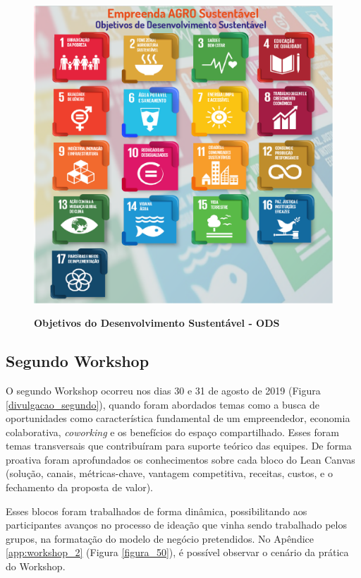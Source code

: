 \begin{figure}[H]
\centering
\caption{\textbf{Objetivos do Desenvolvimento Sustentável - ODS}}
\includegraphics[scale=0.2]{Imagens/ODS_GERAL.png}
\label{ods}
\end{figure}


\subsection{Segundo Workshop}


O segundo Workshop ocorreu nos dias 30 e 31 de agosto de 2019 (Figura \ref{divulgacao_segundo}), quando foram abordados temas como a busca de oportunidades como característica fundamental de um empreendedor, economia colaborativa, \textit{coworking} e os benefícios do espaço compartilhado. Esses foram temas transversais que contribuíram para suporte teórico das equipes. De forma proativa foram aprofundados os conhecimentos sobre cada bloco do Lean Canvas (solução, canais, métricas-chave, vantagem competitiva, receitas, custos, e o fechamento da proposta de valor). 

Esses blocos foram trabalhados de forma dinâmica, possibilitando aos participantes avanços no processo de ideação que vinha sendo trabalhado pelos grupos, na formatação do modelo de negócio pretendidos. No Apêndice \ref{app:workshop_2}  (Figura \ref{figura_50}), 
é possível observar o cenário da prática do Workshop.
 


